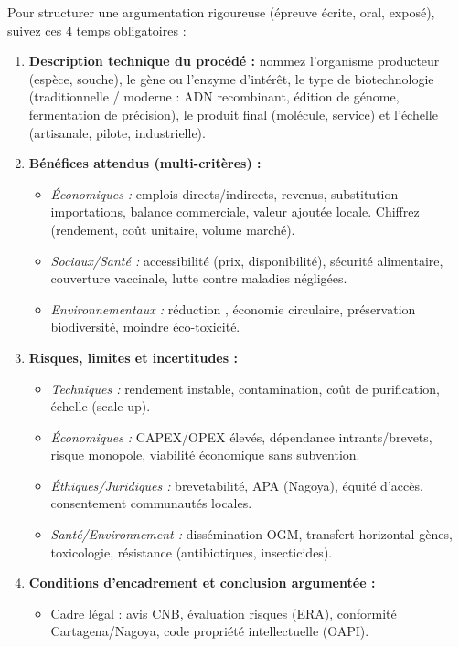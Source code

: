 \documentclass[11pt]{article}
\begin{document}
\begin{methode}
Pour structurer une argumentation rigoureuse (épreuve écrite, oral, exposé), suivez ces 4 temps obligatoires :
\begin{enumerate}
    \item \textbf{Description technique du procédé :} nommez l'organisme producteur (espèce, souche), le gène ou l'enzyme d'intérêt, le type de biotechnologie (traditionnelle / moderne : ADN recombinant, édition de génome, fermentation de précision), le produit final (molécule, service) et l'échelle (artisanale, pilote, industrielle).
    \item \textbf{Bénéfices attendus (multi-critères) :} 
    \begin{itemize}
        \item \textit{Économiques :} emplois directs/indirects, revenus, substitution importations, balance commerciale, valeur ajoutée locale. Chiffrez (rendement, coût unitaire, volume marché).
        \item \textit{Sociaux/Santé :} accessibilité (prix, disponibilité), sécurité alimentaire, couverture vaccinale, lutte contre maladies négligées.
        \item \textit{Environnementaux :} réduction , économie circulaire, préservation biodiversité, moindre éco-toxicité.
    \end{itemize}
    \item \textbf{Risques, limites et incertitudes :} 
    \begin{itemize}
        \item \textit{Techniques :} rendement instable, contamination, coût de purification, échelle (scale-up).
        \item \textit{Économiques :} CAPEX/OPEX élevés, dépendance intrants/brevets, risque monopole, viabilité économique sans subvention.
        \item \textit{Éthiques/Juridiques :} brevetabilité, APA (Nagoya), équité d'accès, consentement communautés locales.
        \item \textit{Santé/Environnement :} dissémination OGM, transfert horizontal gènes, toxicologie, résistance (antibiotiques, insecticides).
    \end{itemize}
    \item \textbf{Conditions d'encadrement et conclusion argumentée :} 
    \begin{itemize}
        \item Cadre légal : avis CNB, évaluation risques (ERA), conformité Cartagena/Nagoya, code propriété intellectuelle (OAPI).

\end{itemize}
\end{enumerate}
\end{methode}
\end{document}
